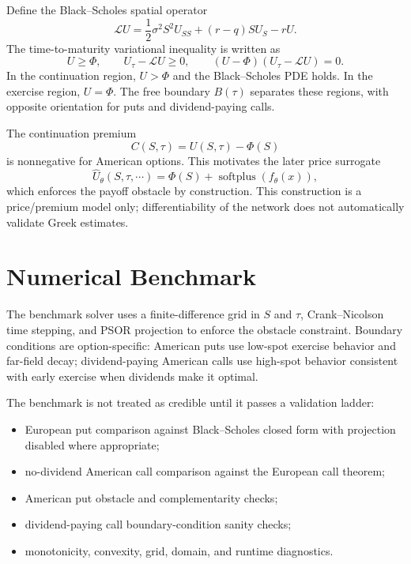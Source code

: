 \documentclass[11pt]{article}
\begin{document}
Define the Black--Scholes spatial operator
\begin{equation}
  \mathcal{L}U =
  \frac{1}{2}\sigma^2 S^2 U_{SS}
  +(r-q)S U_S
  -rU.
\end{equation}
The time-to-maturity variational inequality is written as
\begin{equation}
  U\geq \Phi, \qquad
  U_\tau-\mathcal{L}U\geq 0, \qquad
  (U-\Phi)(U_\tau-\mathcal{L}U)=0.
\end{equation}
In the continuation region, $U>\Phi$ and the Black--Scholes PDE holds. In the exercise region, $U=\Phi$. The free boundary $B(\tau)$ separates these regions, with opposite orientation for puts and dividend-paying calls.

The continuation premium
\begin{equation}
  C(S,\tau)=U(S,\tau)-\Phi(S)
\end{equation}
is nonnegative for American options. This motivates the later price surrogate
\begin{equation}
  \widehat{U}_\theta(S,\tau,\cdots)=\Phi(S)+\operatorname{softplus}(f_\theta(x)),
\end{equation}
which enforces the payoff obstacle by construction. This construction is a price/premium model only; differentiability of the network does not automatically validate Greek estimates.

\section{Numerical Benchmark}
The benchmark solver uses a finite-difference grid in $S$ and $\tau$, Crank--Nicolson time stepping, and PSOR projection to enforce the obstacle constraint. Boundary conditions are option-specific: American puts use low-spot exercise behavior and far-field decay; dividend-paying American calls use high-spot behavior consistent with early exercise when dividends make it optimal.

The benchmark is not treated as credible until it passes a validation ladder:
\begin{itemize}
  \item European put comparison against Black--Scholes closed form with projection disabled where appropriate;
  \item no-dividend American call comparison against the European call theorem;
  \item American put obstacle and complementarity checks;
  \item dividend-paying call boundary-condition sanity checks;
  \item monotonicity, convexity, grid, domain, and runtime diagnostics.
\end{itemize}
\end{document}
